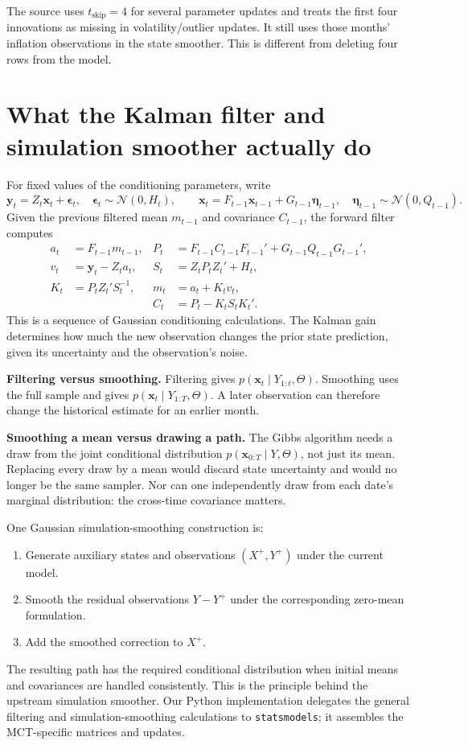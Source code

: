 \documentclass[11pt,a4paper]{article}
\newcommand{\N}{\mathcal N}
\begin{document}
The source uses $t_{\mathrm{skip}}=4$ for several parameter updates and treats the first four innovations as missing in volatility/outlier updates. It still uses those months' inflation observations in the state smoother. This is different from deleting four rows from the model.

\newpage
\section{What the Kalman filter and simulation smoother actually do}
For fixed values of the conditioning parameters, write
\[
\mathbf y_t=Z_t\mathbf x_t+\boldsymbol\epsilon_t,\quad
\boldsymbol\epsilon_t\sim\N(0,H_t),\qquad
\mathbf x_t=F_{t-1}\mathbf x_{t-1}+G_{t-1}\boldsymbol\eta_{t-1},\quad
\boldsymbol\eta_{t-1}\sim\N(0,Q_{t-1}).
\]
Given the previous filtered mean $m_{t-1}$ and covariance $C_{t-1}$, the forward filter computes
\begin{align*}
a_t&=F_{t-1}m_{t-1}, & P_t&=F_{t-1}C_{t-1}F_{t-1}'+G_{t-1}Q_{t-1}G_{t-1}',\\
v_t&=\mathbf y_t-Z_ta_t, & S_t&=Z_tP_tZ_t'+H_t,\\
K_t&=P_tZ_t'S_t^{-1}, & m_t&=a_t+K_tv_t,\\
&& C_t&=P_t-K_tS_tK_t'.
\end{align*}
This is a sequence of Gaussian conditioning calculations. The Kalman gain determines how much the new observation changes the prior state prediction, given its uncertainty and the observation's noise.

\textbf{Filtering versus smoothing.} Filtering gives $p(\mathbf x_t\mid Y_{1:t},\Theta)$. Smoothing uses the full sample and gives $p(\mathbf x_t\mid Y_{1:T},\Theta)$. A later observation can therefore change the historical estimate for an earlier month.

\textbf{Smoothing a mean versus drawing a path.} The Gibbs algorithm needs a draw from the joint conditional distribution $p(\mathbf x_{0:T}\mid Y,\Theta)$, not just its mean. Replacing every draw by a mean would discard state uncertainty and would no longer be the same sampler. Nor can one independently draw from each date's marginal distribution: the cross-time covariance matters.

One Gaussian simulation-smoothing construction is:
\begin{enumerate}
\item Generate auxiliary states and observations $(X^+,Y^+)$ under the current model.
\item Smooth the residual observations $Y-Y^+$ under the corresponding zero-mean formulation.
\item Add the smoothed correction to $X^+$.
\end{enumerate}
The resulting path has the required conditional distribution when initial means and covariances are handled consistently. This is the principle behind the upstream simulation smoother. Our Python implementation delegates the general filtering and simulation-smoothing calculations to \texttt{statsmodels}; it assembles the MCT-specific matrices and updates.
\end{document}
